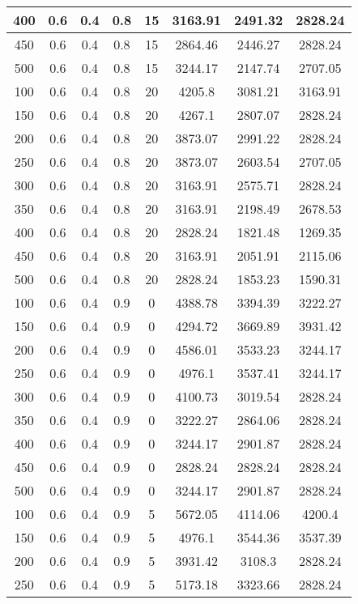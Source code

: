 \documentclass[a4paper, 12pt]{extreport}
\begin{document}
\begin{itemize}
\begin{longtable}{|c|c|c|c|c|c|c|c|}
			400 & 0.6 & 0.4 & 0.8 & 15 & 3163.91 & 2491.32 & 2828.24 \\\hline
			450 & 0.6 & 0.4 & 0.8 & 15 & 2864.46 & 2446.27 & 2828.24 \\\hline
			500 & 0.6 & 0.4 & 0.8 & 15 & 3244.17 & 2147.74 & 2707.05 \\\hline
			100 & 0.6 & 0.4 & 0.8 & 20 & 4205.8 & 3081.21 & 3163.91 \\\hline
			150 & 0.6 & 0.4 & 0.8 & 20 & 4267.1 & 2807.07 & 2828.24 \\\hline
			200 & 0.6 & 0.4 & 0.8 & 20 & 3873.07 & 2991.22 & 2828.24 \\\hline
			250 & 0.6 & 0.4 & 0.8 & 20 & 3873.07 & 2603.54 & 2707.05 \\\hline
			300 & 0.6 & 0.4 & 0.8 & 20 & 3163.91 & 2575.71 & 2828.24 \\\hline
			350 & 0.6 & 0.4 & 0.8 & 20 & 3163.91 & 2198.49 & 2678.53 \\\hline
			400 & 0.6 & 0.4 & 0.8 & 20 & 2828.24 & 1821.48 & 1269.35 \\\hline
			450 & 0.6 & 0.4 & 0.8 & 20 & 3163.91 & 2051.91 & 2115.06 \\\hline
			500 & 0.6 & 0.4 & 0.8 & 20 & 2828.24 & 1853.23 & 1590.31 \\\hline
			100 & 0.6 & 0.4 & 0.9 & 0 & 4388.78 & 3394.39 & 3222.27 \\\hline
			150 & 0.6 & 0.4 & 0.9 & 0 & 4294.72 & 3669.89 & 3931.42 \\\hline
			200 & 0.6 & 0.4 & 0.9 & 0 & 4586.01 & 3533.23 & 3244.17 \\\hline
			250 & 0.6 & 0.4 & 0.9 & 0 & 4976.1 & 3537.41 & 3244.17 \\\hline
			300 & 0.6 & 0.4 & 0.9 & 0 & 4100.73 & 3019.54 & 2828.24 \\\hline
			350 & 0.6 & 0.4 & 0.9 & 0 & 3222.27 & 2864.06 & 2828.24 \\\hline
			400 & 0.6 & 0.4 & 0.9 & 0 & 3244.17 & 2901.87 & 2828.24 \\\hline
			450 & 0.6 & 0.4 & 0.9 & 0 & 2828.24 & 2828.24 & 2828.24 \\\hline
			500 & 0.6 & 0.4 & 0.9 & 0 & 3244.17 & 2901.87 & 2828.24 \\\hline
			100 & 0.6 & 0.4 & 0.9 & 5 & 5672.05 & 4114.06 & 4200.4 \\\hline
			150 & 0.6 & 0.4 & 0.9 & 5 & 4976.1 & 3544.36 & 3537.39 \\\hline
			200 & 0.6 & 0.4 & 0.9 & 5 & 3931.42 & 3108.3 & 2828.24 \\\hline
			250 & 0.6 & 0.4 & 0.9 & 5 & 5173.18 & 3323.66 & 2828.24 \\\hline

\end{longtable}
\end{itemize}
\end{document}
